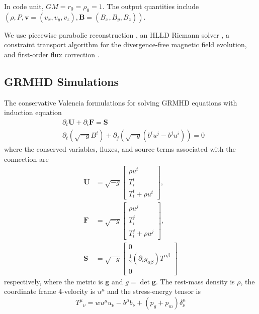 \documentclass{article}
\begin{document}
In code unit, $GM=r_0=\rho_0=1$. The output quantities include $(\rho, P, \boldsymbol{v}=(v_x, v_y, v_z), \boldsymbol{B}=(B_x, B_y, B_z))$.

We use piecewise parabolic reconstruction \citep{Colella1984}, an HLLD Riemann solver \citep{Miyoshi2005},  a constraint transport algorithm \citep{Gardiner2008} for the divergence-free magnetic field evolution, and first-order flux correction \cite{2009ApJ...691.1092L}.

\subsection{GRMHD Simulations}
The conservative Valencia formulations for solving GRMHD equations with induction equation
\begin{align}
     &\partial_t\boldsymbol{U} + \partial_i\boldsymbol{F}=\boldsymbol{S} \\
     &\partial_t (\sqrt{-g}B^i)+\partial_j(\sqrt{-g}(b^iu^j-b^ju^i))=0
\end{align}
where the conserved variables, fluxes, and source terms associated with the connection are
\begin{equation}
\begin{aligned}
\mathbf{U} &=\sqrt{-g}\left[\begin{array}{c}
\rho u^t \\
T_i^t \\
T_t^t+\rho u^t
\end{array}\right], \\
\mathbf{F} &=\sqrt{-g}\left[\begin{array}{c}
\rho u^j \\
T_i^j \\
T_t^j+\rho u^j
\end{array}\right], \\
\mathbf{S} & =\sqrt{-g}\left[\begin{array}{c}
0 \\
\frac{1}{2}\left(\partial_i g_{\alpha \beta}\right) T^{\alpha \beta} \\
0
\end{array}\right]
\end{aligned}
\end{equation}
respectively, where the metric is $\boldsymbol{g}$ and $g=\det{\boldsymbol{g}}$. The rest-mass density is $\rho$, the coordinate frame 4-velocity is $u^\mu$ and the stress-energy tensor is 
\begin{equation}
    {T^\mu}_{\nu} = w u^\mu u_\nu-b^\mu b_\nu + (p_g+p_m)\delta^\mu_\nu
\end{equation}
\end{document}
